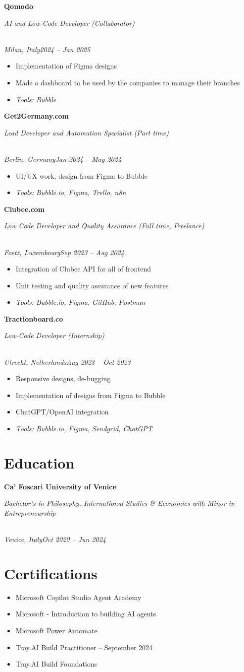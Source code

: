 \documentclass[a4paper,10pt]{article}
\newcommand{\role}[4]{\vspace{3pt}\noindent\hspace{0.6em}\parbox[t]{0.38\textwidth}{\raggedright\textbf{#1}}\hfill\parbox[t]{0.58\textwidth}{\raggedleft\textit{#2}}\\{\textit{#3}\hfill\textit{#4}}\vspace{1pt}}
\begin{document}
\role{Qomodo}{AI and Low-Code Developer (Collaborator)}{Milan, Italy}{2024 -- Jan 2025}
\begin{itemize}
\item Implementation of Figma designs
\item Made a dashboard to be used by the companies to manage their branches
\item \textit{Tools: Bubble}
\end{itemize}

\role{Get2Germany.com}{Lead Developer and Automation Specialist (Part time)}{Berlin, Germany}{Jan 2024 -- May 2024}
\begin{itemize}
\item UI/UX work, design from Figma to Bubble
\item \textit{Tools: Bubble.io, Figma, Trello, n8n}
\end{itemize}

\role{Clubee.com}{Low Code Developer and Quality Assurance (Full time, Freelance)}{Foetz, Luxembourg}{Sep 2023 -- Aug 2024}
\begin{itemize}
\item Integration of Clubee API for all of frontend
\item Unit testing and quality assurance of new features
\item \textit{Tools: Bubble.io, Figma, GitHub, Postman}
\end{itemize}

\role{Tractionboard.co}{Low-Code Developer (Internship)}{Utrecht, Netherlands}{Aug 2023 -- Oct 2023}
\begin{itemize}
\item Responsive designs, de-bugging
\item Implementation of designs from Figma to Bubble
\item ChatGPT/OpenAI integration
\item \textit{Tools: Bubble.io, Figma, Sendgrid, ChatGPT}
\end{itemize}

\section{Education}
\role{Ca' Foscari University of Venice}{Bachelor's in Philosophy, International Studies \& Economics with Minor in Entrepreneurship}{Venice, Italy}{Oct 2020 -- Jun 2024}

\section{Certifications}
\begin{itemize}
\item Microsoft Copilot Studio Agent Academy
\item Microsoft - Introduction to building AI agents
\item Microsoft Power Automate
\item Tray.AI Build Practitioner -- September 2024
\item Tray.AI Build Foundations
\end{itemize}
\end{document}

